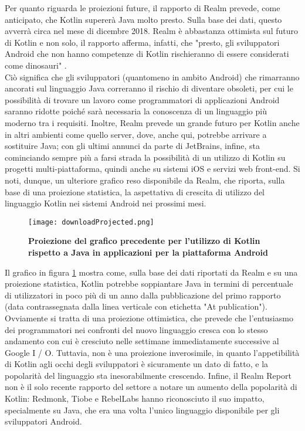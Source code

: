 Per quanto riguarda le proiezioni future, il rapporto di Realm prevede, come anticipato, che Kotlin supererà Java molto presto. Sulla base dei dati, questo avverrà circa nel mese di dicembre 2018. Realm è abbastanza ottimista sul futuro di Kotlin e non solo, il rapporto afferma, infatti, che "presto, gli sviluppatori Android che non hanno competenze di Kotlin rischieranno di essere considerati come dinosauri" \cite{realmReport}.\\
Ciò significa che gli sviluppatori (quantomeno in ambito Android) che rimarranno ancorati sul linguaggio Java correranno il rischio di diventare obsoleti, per cui le possibilità di trovare un lavoro come programmatori di applicazioni Android saranno ridotte poiché sarà necessaria la conoscenza di un linguaggio più moderno tra i requisiti. Inoltre, Realm prevede un grande futuro per Kotlin anche in altri ambienti come quello server, dove, anche qui, potrebbe arrivare a sostituire Java; con gli ultimi annunci da parte di JetBrains, infine, sta cominciando sempre più a farsi strada la possibilità di un utilizzo di Kotlin su progetti multi-piattaforma, quindi anche su sistemi iOS e servizi web front-end.
Si noti, dunque, un ulteriore grafico reso disponibile da Realm, che riporta, sulla base di una proiezione statistica, la aspettativa di crescita di utilizzo del linguaggio Kotlin nei sistemi Android nei prossimi mesi.\\

\begin{figure}[ht]
  \centering
  \texttt{[image: downloadProjected.png]}
  \caption{{\bfseries Proiezione del grafico precedente per l'utilizzo di Kotlin rispetto a Java in applicazioni per la piattaforma Android}}
  \label{projected}
\end{figure}

Il grafico in figura \ref{projected} mostra come, sulla base dei dati riportati da Realm e su una proiezione statistica, Kotlin potrebbe soppiantare Java in termini di percentuale di utilizzatori in poco più di un anno dalla pubblicazione del primo rapporto (data contrassegnata dalla linea verticale con etichetta "At publication"). Ovviamente si tratta di una proiezione ottimistica, che prevede che l'entusiasmo dei programmatori nei confronti del nuovo linguaggio cresca con lo stesso andamento con cui è cresciuto nelle settimane immediatamente successive al Google I / O. Tuttavia, non è una proiezione inverosimile, in quanto l'appetibilità di Kotlin agli occhi degli sviluppatori è sicuramente un dato di fatto, e la popolarità del linguaggio sta inesorabilmente crescendo. Infine, il Realm Report non è il solo recente rapporto del settore a notare un aumento della popolarità di Kotlin: Redmonk, Tiobe e RebelLabs hanno riconosciuto il suo impatto, specialmente su Java, che era una volta l'unico linguaggio disponibile per gli sviluppatori Android.
